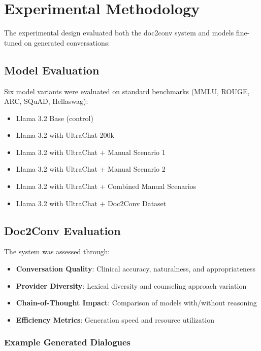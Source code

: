 \section{Experimental Methodology}

The experimental design evaluated both the doc2conv system and models fine-tuned on generated conversations:

\subsection{Model Evaluation}

Six model variants were evaluated on standard benchmarks (MMLU, ROUGE, ARC, SQuAD, Hellaswag):

\begin{itemize}
    \item Llama 3.2 Base (control)
    \item Llama 3.2 with UltraChat-200k
    \item Llama 3.2 with UltraChat + Manual Scenario 1
    \item Llama 3.2 with UltraChat + Manual Scenario 2
    \item Llama 3.2 with UltraChat + Combined Manual Scenarios
    \item Llama 3.2 with UltraChat + Doc2Conv Dataset
\end{itemize}

\subsection{Doc2Conv Evaluation}

The system was assessed through:

\begin{itemize}
    \item \textbf{Conversation Quality}: Clinical accuracy, naturalness, and appropriateness
    \item \textbf{Provider Diversity}: Lexical diversity and counseling approach variation
    \item \textbf{Chain-of-Thought Impact}: Comparison of models with/without reasoning
    \item \textbf{Efficiency Metrics}: Generation speed and resource utilization
\end{itemize}

\subsubsection{Example Generated Dialogues}

